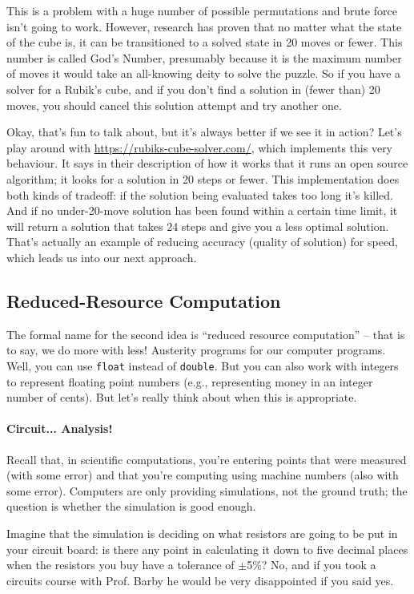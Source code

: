 \documentclass[a4paper]{report}
\begin{document}
This is a problem with a huge number of possible permutations and brute force isn't going to work. However, research has proven that no matter what the state of the cube is, it can be transitioned to a solved state in 20 moves or fewer. This number is called God's Number, presumably because it is the maximum number of moves it would take an all-knowing deity to solve the puzzle. So if you have a solver for a Rubik's cube, and if you don't find a solution in (fewer than) 20 moves, you should cancel this solution attempt and try another one.

Okay, that's fun to talk about, but it's always better if we see it in action? Let's play around with \url{https://rubiks-cube-solver.com/}, which implements this very behaviour. It says in their description of how it works that it runs an open source algorithm; it looks for a solution in 20 steps or fewer. This implementation does both kinds of tradeoff: if the solution being evaluated takes too long it's killed. And if no under-20-move solution has been found within a certain time limit, it will return a solution that takes 24 steps and give you a less optimal solution. That's actually an example of reducing accuracy (quality of solution) for speed, which leads us into our next approach.

\subsection*{Reduced-Resource Computation}

The formal name for the second idea is ``reduced resource computation'' -- that is to say, we do more with less! Austerity programs for our computer programs. Well, you can use \texttt{float} instead of \texttt{double}. But you can also work with integers to represent floating point numbers (e.g., representing money in an integer number of cents). But let's really  think about when this is appropriate.

\paragraph{Circuit... Analysis!} Recall that, in scientific computations, you're entering points that were measured (with some error) and that you're computing using machine numbers (also with some error). Computers are only providing simulations, not the ground truth; the question is whether the simulation is good enough.

Imagine that the simulation is deciding on what resistors are going to be put in your circuit board: is there any point in calculating it down to five decimal places when the resistors you buy have a tolerance of $\pm$5\%? No, and if you took a circuits course with Prof. Barby he would be very disappointed if you said yes.
\end{document}
